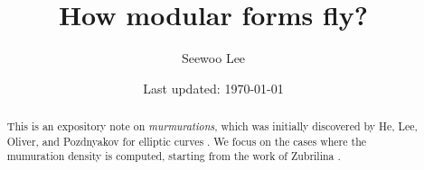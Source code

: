 \documentclass[letterpaper, 10pt]{article}
\begin{document}

\title{How modular forms fly?}


\author{Seewoo Lee}
\date{\normalsize\vspace{-1ex} Last updated: \today}


\maketitle


\begin{abstract}
    This is an expository note on \emph{murmurations}, which was initially discovered by He, Lee, Oliver, and Pozdnyakov for elliptic curves \cite{he2024murmurations}.
    We focus on the cases where the mumuration density is computed, starting from the work of Zubrilina \cite{zubrilina2023murmurations}.
\end{abstract}






\newpage




{
\small
}







\end{document}
